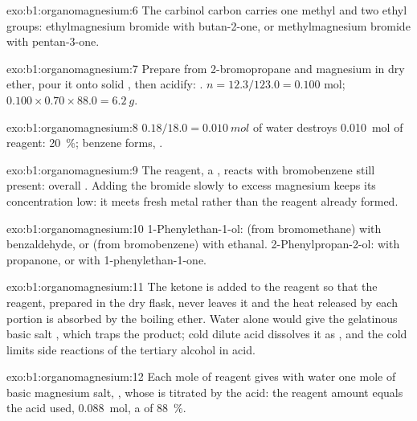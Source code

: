 \begin{solution}{exo:b1:organomagnesium:6}
The carbinol carbon carries one methyl and two ethyl groups:
ethylmagnesium bromide with butan-2-one, or methylmagnesium bromide with
pentan-3-one.
\end{solution}

\begin{solution}{exo:b1:organomagnesium:7}
Prepare  from 2-bromopropane and magnesium in dry ether,
pour it onto solid , then acidify: . $n = 12.3/123.0 = 0.100$ mol;
$0.100 \times 0.70 \times 88.0 = \qty{6.2}{g}$.
\end{solution}

\begin{solution}{exo:b1:organomagnesium:8}
$0.18/18.0 = \qty{0.010}{mol}$ of water destroys \qty{0.010}{mol} of
reagent: \qty{20}{\percent}; benzene forms, .
\end{solution}

\begin{solution}{exo:b1:organomagnesium:9}
The reagent, a , reacts with bromobenzene still present:
overall . Adding the bromide
slowly to excess magnesium keeps its concentration low: it meets fresh
metal rather than the reagent already formed.
\end{solution}

\begin{solution}{exo:b1:organomagnesium:10}
1-Phenylethan-1-ol:  (from bromomethane) with benzaldehyde,
or  (from bromobenzene) with ethanal. 2-Phenylpropan-2-ol:
 with propanone, or  with
1-phenylethan-1-one.
\end{solution}

\begin{solution}{exo:b1:organomagnesium:11}
The ketone is added to the reagent so that the reagent, prepared in the
dry flask, never leaves it and the heat released by each portion is
absorbed by the boiling ether. Water alone would give the gelatinous
basic salt , which traps the product; cold dilute acid
dissolves it as , and the cold limits side reactions of the
tertiary alcohol in acid.
\end{solution}

\begin{solution}{exo:b1:organomagnesium:12}
Each mole of reagent gives with water one mole of basic magnesium salt,
, whose  is titrated by the acid:
the reagent amount equals the acid used, \qty{0.088}{mol}, a  of
\qty{88}{\percent}.
\end{solution}

